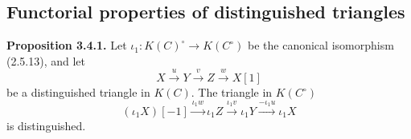 \subsection{Functorial properties of distinguished triangles}

\noindent\textbf{Proposition 3.4.1.}\quad
Let
$\iota_1\colon K(C)^{\circ}\longrightarrow K(C^{\circ})$
be the canonical isomorphism (2.5.13), and let
\[
  X\xrightarrow{u}Y\xrightarrow{v}Z\xrightarrow{w}X[1]
\]
be a distinguished triangle in $K(C)$. The triangle in $K(C^{\circ})$
\[
  (\iota_1X)[-1]\xrightarrow{\iota_1w}\iota_1Z
  \xrightarrow{\iota_1v}\iota_1Y
  \xrightarrow{-\iota_1u}\iota_1X
\]
is distinguished.
\endgroup

